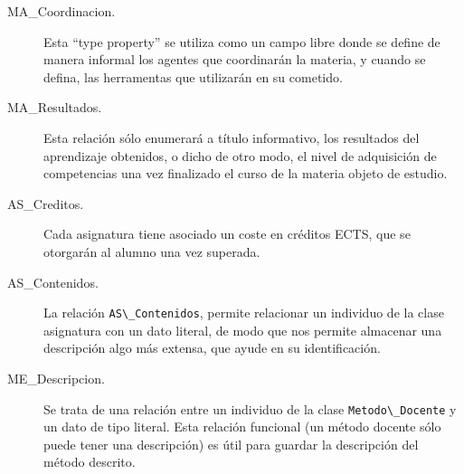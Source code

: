 \begin{description}
	   \item [MA\_Coordinacion.] Esta ``type property'' se utiliza como un campo libre donde se define de manera informal los agentes que coordinarán la materia, y cuando se defina, las herramentas que utilizarán en su cometido.
		 

		\item [MA\_Resultados.] Esta relación sólo enumerará a título informativo, los resultados del aprendizaje obtenidos, o dicho de otro modo, el nivel de adquisición de competencias una vez finalizado el curso de la materia objeto de estudio.  
   		
			
		\item [AS\_Creditos.] Cada asignatura tiene asociado un coste en créditos ECTS, que se otorgarán al alumno una vez superada.
   		
			
		\item [AS\_Contenidos.] La relación \lstinline!AS\_Contenidos!, permite relacionar un individuo de la clase asignatura con un dato literal, de modo que nos permite almacenar una descripción algo más extensa, que ayude en su identificación.  
		   



		\item [ME\_Descripcion.] Se trata de una relación entre un individuo de la clase \lstinline!Metodo\_Docente! y un dato de tipo literal. Esta relación funcional (un método docente sólo puede tener una descripción) es útil para guardar la descripción del método descrito.
   		   
			

\end{description}
